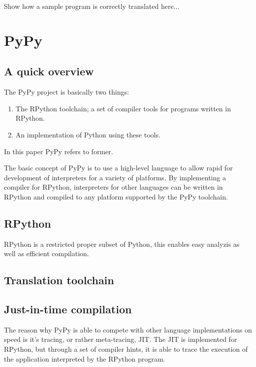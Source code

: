 \documentclass{article}
\begin{document}
Show how a sample program is correctly translated here...

\section{PyPy}

\subsection{A quick overview}

The PyPy project is basically two things:

\begin{enumerate}

\item The RPython toolchain; a set of compiler tools for programs written in 
RPython.

\item An implementation of Python using these tools.

\end{enumerate}

In this paper PyPy refers to former.

The basic concept of PyPy is to use a high-level language to allow rapid for
development of interpreters for a variety of platforms. By implementing a compiler
for RPython, interpreters for other languages can be written in RPython and 
compiled to any platform supported by the PyPy toolchain.

\subsection{RPython}

RPython is a restricted proper subset of Python, this enables easy analyzis 
as well as efficient compilation.

\subsection{Translation toolchain}


\subsection{Just-in-time compilation}

The reason why PyPy is able to compete with other language implementations
on speed is it's tracing, or rather meta-tracing, JIT. The JIT is implemented
for RPython, but through a set of compiler hints, it is able to trace the 
execution of the application interpreted by the RPython program.
\end{document}
